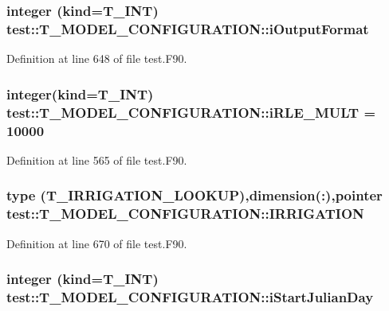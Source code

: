 \hypertarget{typetest_1_1_t___m_o_d_e_l___c_o_n_f_i_g_u_r_a_t_i_o_n_a41a8ef4e1ce332526406479cc7158e64}{
\subsubsection[{iOutputFormat}]{\setlength{\rightskip}{0pt plus 5cm}integer (kind={\bf T\_\-INT}) {\bf test::T\_\-MODEL\_\-CONFIGURATION::iOutputFormat}}}
\label{typetest_1_1_t___m_o_d_e_l___c_o_n_f_i_g_u_r_a_t_i_o_n_a41a8ef4e1ce332526406479cc7158e64}


Definition at line 648 of file test.F90.

\hypertarget{typetest_1_1_t___m_o_d_e_l___c_o_n_f_i_g_u_r_a_t_i_o_n_a4a9f607f0c91f345915f6bc9cdf683ad}{
\subsubsection[{iRLE\_\-MULT}]{\setlength{\rightskip}{0pt plus 5cm}integer(kind={\bf T\_\-INT}) {\bf test::T\_\-MODEL\_\-CONFIGURATION::iRLE\_\-MULT} = 10000}}
\label{typetest_1_1_t___m_o_d_e_l___c_o_n_f_i_g_u_r_a_t_i_o_n_a4a9f607f0c91f345915f6bc9cdf683ad}


Definition at line 565 of file test.F90.

\hypertarget{typetest_1_1_t___m_o_d_e_l___c_o_n_f_i_g_u_r_a_t_i_o_n_a1420e3cbe2e7b347a5519cee404a404e}{
\subsubsection[{IRRIGATION}]{\setlength{\rightskip}{0pt plus 5cm}type ({\bf T\_\-IRRIGATION\_\-LOOKUP}),dimension(:),pointer {\bf test::T\_\-MODEL\_\-CONFIGURATION::IRRIGATION}}}
\label{typetest_1_1_t___m_o_d_e_l___c_o_n_f_i_g_u_r_a_t_i_o_n_a1420e3cbe2e7b347a5519cee404a404e}


Definition at line 670 of file test.F90.

\hypertarget{typetest_1_1_t___m_o_d_e_l___c_o_n_f_i_g_u_r_a_t_i_o_n_ae7c0e66b9ae35864c3ecaf8daf437d31}{
\subsubsection[{iStartJulianDay}]{\setlength{\rightskip}{0pt plus 5cm}integer (kind={\bf T\_\-INT}) {\bf test::T\_\-MODEL\_\-CONFIGURATION::iStartJulianDay}}}
\label{typetest_1_1_t___m_o_d_e_l___c_o_n_f_i_g_u_r_a_t_i_o_n_ae7c0e66b9ae35864c3ecaf8daf437d31}



